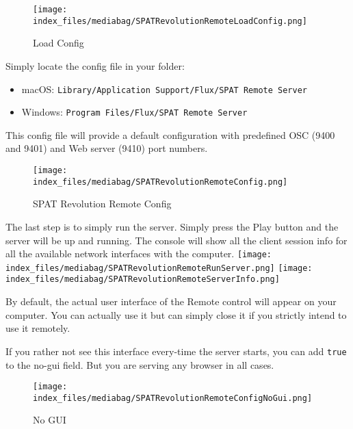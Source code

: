 \documentclass[
  letterpaper,
  DIV=11,
  numbers=noendperiod]{scrreport}
\providecommand{\tightlist}{%
  \setlength{\itemsep}{0pt}\setlength{\parskip}{0pt}}\usepackage{longtable,booktabs,array}
\begin{document}
\begin{figure}

{\centering \texttt{[image: index\_files/mediabag/SPATRevolutionRemoteLoadConfig.png]}

}

\caption{Load Config}

\end{figure}

Simply locate the config file in your folder:

\begin{itemize}
\tightlist
\item
  macOS: \texttt{Library/Application\ Support/Flux/SPAT\ Remote\ Server}
\item
  Windows: \texttt{Program\ Files/Flux/SPAT\ Remote\ Server}
\end{itemize}

This config file will provide a default configuration with predefined
OSC (9400 and 9401) and Web server (9410) port numbers.

\begin{figure}

{\centering \texttt{[image: index\_files/mediabag/SPATRevolutionRemoteConfig.png]}

}

\caption{SPAT Revolution Remote Config}

\end{figure}

The last step is to simply run the server. Simply press the Play button
and the server will be up and running. The console will show all the
client session info for all the available network interfaces with the
computer.
\texttt{[image: index\_files/mediabag/SPATRevolutionRemoteRunServer.png]}
\texttt{[image: index\_files/mediabag/SPATRevolutionRemoteServerInfo.png]}

By default, the actual user interface of the Remote control will appear
on your computer. You can actually use it but can simply close it if you
strictly intend to use it remotely.

If you rather not see this interface every-time the server starts, you
can add \texttt{true} to the no-gui field. But you are serving any
browser in all cases.

\begin{figure}

{\centering \texttt{[image: index\_files/mediabag/SPATRevolutionRemoteConfigNoGui.png]}

}

\caption{No GUI}

\end{figure}
\end{document}

